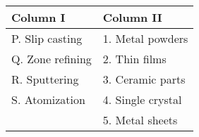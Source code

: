 \begin{tabular}{| p{4cm} | p{6cm} |}
    \hline
    \textbf{Column I} & \textbf{Column II} \\
    \hline
    P. Slip casting & 1. Metal powders \\
    \hline
    Q. Zone refining & 2. Thin films \\
    \hline
    R. Sputtering & 3. Ceramic parts \\
    \hline
    S. Atomization & 4. Single crystal \\
    \hline
    & 5. Metal sheets \\
    \hline
\end{tabular}
